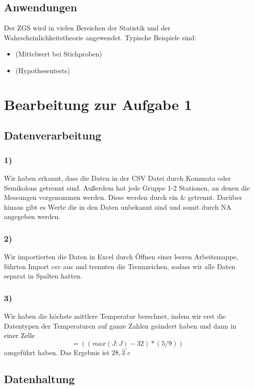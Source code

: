 \documentclass[12pt,a4paper]{article}
\begin{document}
\subsection{Anwendungen}

Der ZGS wird in vielen Bereichen der Statistik und der Wahrscheinlichkeitstheorie angewendet. Typische Beispiele sind:
\begin{itemize}
    \item (Mittelwert bei Stichproben)
    \item (Hypothesentests)
\end{itemize}

\newpage

\section{Bearbeitung zur Aufgabe 1}
\subsection{Datenverarbeitung}
\subsubsection{1)}
Wir haben erkannt, dass die Daten in der CSV Datei durch Kommata oder Semikolons getrennt sind. Außerdem hat jede Gruppe 1-2 Stationen, an denen die Messungen vorgenommen werden. Diese werden durch ein \& getrennt. Darüber hinaus gibt es Werte die in den Daten unbekannt sind und somit durch NA angegeben werden.

\subsubsection{2)}
Wir importierten die Daten in Excel durch Öffnen einer leeren Arbeitsmappe, führten Import csv aus und trennten die Trennzeichen, sodass wir alle Daten separat in Spalten hatten.

\subsubsection{3)}
Wir haben die höchste mittlere Temperatur berechnet, indem wir erst die Datentypen der Temperaturen auf ganze Zahlen geändert haben und dann in einer Zelle $$=((max(J:J)-32)*(5/9))$$
ausgeführt haben. Das Ergebnis ist $28,\overline{3}^\circ c$


\subsection{Datenhaltung}
\end{document}
